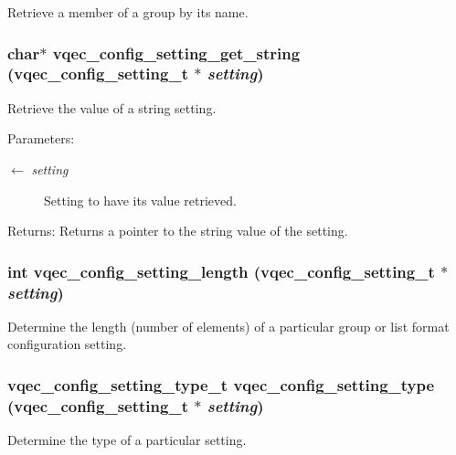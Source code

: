Retrieve a member of a group by its name. 
\subsubsection{\setlength{\rightskip}{0pt plus 5cm}char$\ast$ vqec\_\-config\_\-setting\_\-get\_\-string (\bf{vqec\_\-config\_\-setting\_\-t} $\ast$ {\em setting})}\label{vqec__config__parser_8h_3b1a12dff91d6b592b26b497ee6bcefe}


Retrieve the value of a string setting.

\begin{Desc}
\item[Parameters:]
\begin{description}
\item[\mbox{$\leftarrow$} {\em setting}]Setting to have its value retrieved. \end{description}
\end{Desc}
\begin{Desc}
\item[Returns:]Returns a pointer to the string value of the setting. \end{Desc}
\subsubsection{\setlength{\rightskip}{0pt plus 5cm}int vqec\_\-config\_\-setting\_\-length (\bf{vqec\_\-config\_\-setting\_\-t} $\ast$ {\em setting})}\label{vqec__config__parser_8h_05aa9a1e8cbfa61f7b11ce785695e742}


Determine the length (number of elements) of a particular group or list format configuration setting. 
\subsubsection{\setlength{\rightskip}{0pt plus 5cm}\bf{vqec\_\-config\_\-setting\_\-type\_\-t} vqec\_\-config\_\-setting\_\-type (\bf{vqec\_\-config\_\-setting\_\-t} $\ast$ {\em setting})}\label{vqec__config__parser_8h_289e2c5093c37152d8c5c02c98f1ddd8}


Determine the type of a particular setting. 